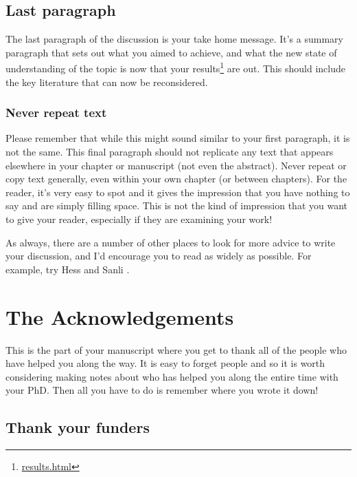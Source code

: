 \documentclass[
]{krantz}
\renewcommand{\href}[2]{#2\footnote{\url{#1}}}
\begin{document}
\hypertarget{last-paragraph}{%
\subsection{Last paragraph}\label{last-paragraph}}

The last paragraph of the discussion is your take home message. It's a summary paragraph that sets out what you aimed to achieve, and what the new state of understanding of the topic is now that your \href{results.html}{results} are out. This should include the key literature that can now be reconsidered.

\hypertarget{never-repeat-text}{%
\subsubsection{Never repeat text}\label{never-repeat-text}}

Please remember that while this might sound similar to your first paragraph, it is not the same. This final paragraph should not replicate any text that appears elsewhere in your chapter or manuscript (not even the abstract). Never repeat or copy text generally, even within your own chapter (or between chapters). For the reader, it's very easy to spot and it gives the impression that you have nothing to say and are simply filling space. This is not the kind of impression that you want to give your reader, especially if they are examining your work!

As always, there are a number of other places to look for more advice to write your discussion, and I'd encourage you to read as widely as possible. For example, try Hess \citeyearpar{hess2004how} and Sanli \citeyearpar{sanli2013how}.

\hypertarget{acknowledgements}{%
\section{The Acknowledgements}\label{acknowledgements}}

This is the part of your manuscript where you get to thank all of the people who have helped you along the way. It is easy to forget people and so it is worth considering making notes about who has helped you along the entire time with your PhD. Then all you have to do is remember where you wrote it down!

\hypertarget{thank-your-funders}{%
\subsection{Thank your funders}\label{thank-your-funders}}
\end{document}
